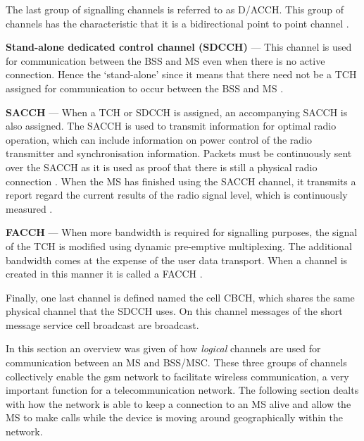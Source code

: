 The last group of signalling channels is referred to as \gls{D/ACCH}. This group of channels has the characteristic that it is a bidirectional point to point channel \cite{GSMArchitectureProtocolsServices}.
\begin{description}
  \item{\textbf{Stand-alone dedicated control channel (\gls{SDCCH})}} --- This channel is used for communication between the \gls{BSS} and \gls{MS} even when there is no active connection. Hence the `stand-alone' since it means that there need not be a \gls{TCH} assigned for communication to occur between the \gls{BSS} and \gls{MS} \cite{GSMArchitectureProtocolsServices}.
  \item{\textbf{\gls{SACCH}}} --- When a \gls{TCH} or \gls{SDCCH} is assigned, an accompanying \gls{SACCH} is also assigned. The \gls{SACCH} is used to transmit information for optimal radio operation, which can include information on power control of the radio transmitter and synchronisation information. Packets must be continuously sent over the \gls{SACCH} as it is used as proof that there is still a physical radio connection \cite{GSMArchitectureProtocolsServices}. When the \gls{MS} has finished using the \gls{SACCH} channel, it transmits a report regard the current results of the radio signal level, which is continuously measured \cite{GSMArchitectureProtocolsServices}.
  \item{\textbf{\gls{FACCH}}} --- When more bandwidth is required for signalling purposes, the signal of the \gls{TCH} is modified using dynamic pre-emptive multiplexing. The additional bandwidth comes at the expense of the user data transport. When a channel is created in this manner it is called a \gls{FACCH} \cite{GSMArchitectureProtocolsServices}.
\end{description}

Finally, one last channel is defined named the cell \gls{CBCH}, which shares the same physical channel that the \gls{SDCCH} uses. On this channel messages of the short message service cell broadcast are broadcast\cite{GSMArchitectureProtocolsServices}.

In this section an overview was given of how \emph{logical} channels are used for communication between an \gls{MS}  and \gls{BSS}/\gls{MSC}\@. These three groups of channels collectively enable the \gls{gsm} network to facilitate wireless communication, a very important function for a telecommunication network. The following section dealts with how the network is able to keep a connection to an \gls{MS} alive and allow the \gls{MS} to make calls while the device is moving around geographically within the network.
